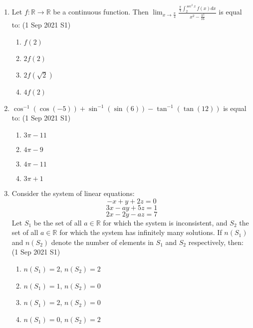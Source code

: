 \documentclass[journal]{IEEEtran}
\begin{document}
\begin{enumerate}
    \item Let $f : \mathbb{R} \rightarrow \mathbb{R}$ be a continuous function. Then
    $\lim_{x \to \frac{\pi}{4}} \frac{\frac{\pi}{4} \int_{2}^{\sec^2 x} f(x) dx}{ x^2 - \frac{\pi^2}{16}}$
    is equal to: \hfill (1 Sep 2021 S1)
    \begin{multicols}{4}
        \begin{enumerate}
            \item $f(2)$
            \item $2f(2)$
            \item $2f(\sqrt{2})$
            \item $4f(2)$
        \end{enumerate}
    \end{multicols}
    
    \item $\cos^{-1}(\cos(-5)) + \sin^{-1}(\sin(6)) - \tan^{-1}(\tan(12))$ is equal to: \hfill (1 Sep 2021 S1)
    \begin{multicols}{4}
        \begin{enumerate}
            \item $3\pi - 11$
            \item $4\pi - 9$
            \item $4\pi - 11$
            \item $3\pi + 1$
        \end{enumerate}
    \end{multicols}

    \item Consider the system of linear equations:
    $$
    -x + y + 2z = 0
    $$
    $$
    3x - ay + 5z = 1
    $$
    $$
    2x - 2y - az = 7
    $$
    Let $S_1$ be the set of all $a \in \mathbb{R}$ for which the system is inconsistent, and $S_2$ the set of all $a \in \mathbb{R}$ for which the system has infinitely many solutions. If $n(S_1)$ and $n(S_2)$ denote the number of elements in $S_1$ and $S_2$ respectively, then: \hfill (1 Sep 2021 S1)
    \begin{multicols}{2}
        \begin{enumerate}
            \item $n(S_1) = 2$, $n(S_2) = 2$
            \item $n(S_1) = 1$, $n(S_2) = 0$
            \item $n(S_1) = 2$, $n(S_2) = 0$
            \item $n(S_1) = 0$, $n(S_2) = 2$
        \end{enumerate}
    \end{multicols}
    

\end{enumerate}
\end{document}
